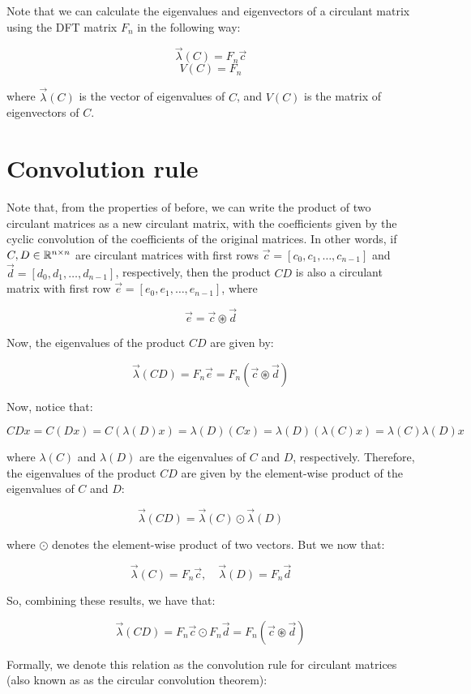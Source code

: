 Note that we can calculate the eigenvalues and eigenvectors of a circulant matrix using the DFT matrix
$F_n$ in the following way:

$$\vec{\lambda}(C) = F_n \vec{c}$$
$$V(C) = F_n$$

where $\vec{\lambda}(C)$ is the vector of eigenvalues of $C$, and $V(C)$ is the matrix of eigenvectors of $C$.

\section{Convolution rule}

Note that, from the properties of before, we can write the product of two circulant matrices as a new
circulant matrix, with the coefficients given by the cyclic convolution of the coefficients of the original
matrices. In other words, if $C, D \in \mathbb{R}^{n \times n}$ are circulant matrices with first rows
$\vec{c} = [c_0, c_1, \ldots, c_{n-1}]$ and $\vec{d} = [d_0, d_1, \ldots, d_{n-1}]$, respectively, then
the product $CD$ is also a circulant matrix with first row $\vec{e} = [e_0, e_1, \ldots, e_{n-1}]$, where

$$\vec{e} = \vec{c} \circledast \vec{d}$$

Now, the eigenvalues of the product $CD$ are given by:

$$\vec{\lambda}(CD) = F_n \vec{e} = F_n (\vec{c} \circledast \vec{d})$$

Now, notice that:

$$CD x = C (Dx) = C (\lambda(D) x) = \lambda(D) (Cx) = \lambda(D) (\lambda(C) x) = \lambda(C) \lambda(D) x$$

where $\lambda(C)$ and $\lambda(D)$ are the eigenvalues of $C$ and $D$, respectively. Therefore, the eigenvalues
of the product $CD$ are given by the element-wise product of the eigenvalues of $C$ and $D$:

$$\vec{\lambda}(CD) = \vec{\lambda}(C) \odot \vec{\lambda}(D)$$

where $\odot$ denotes the element-wise product of two vectors. But we now that:

$$\vec{\lambda}(C) = F_n \vec{c}, \quad \vec{\lambda}(D) = F_n \vec{d}$$

So, combining these results, we have that:

$$\vec{\lambda}(CD) = F_n \vec{c} \odot F_n \vec{d} = F_n (\vec{c} \circledast \vec{d})$$

Formally, we denote this relation as the convolution rule for circulant matrices (also known as 
as the circular convolution theorem):

